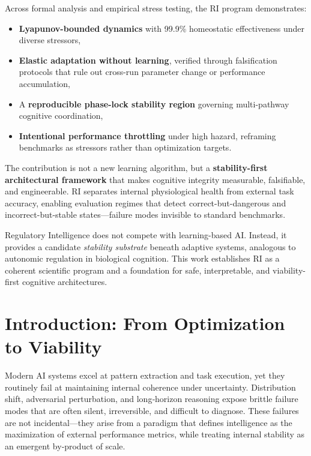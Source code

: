\documentclass[12pt,a4paper]{report}
\begin{document}
Across formal analysis and empirical stress testing, the RI program demonstrates:

\begin{itemize}
    \item \textbf{Lyapunov-bounded dynamics} with 99.9\% homeostatic effectiveness under diverse stressors,
    \item \textbf{Elastic adaptation without learning}, verified through falsification protocols that rule out cross-run parameter change or performance accumulation,
    \item A \textbf{reproducible phase-lock stability region} governing multi-pathway cognitive coordination,
    \item \textbf{Intentional performance throttling} under high hazard, reframing benchmarks as stressors rather than optimization targets.
\end{itemize}

The contribution is not a new learning algorithm, but a \textbf{stability-first architectural framework} that makes cognitive integrity measurable, falsifiable, and engineerable. RI separates internal physiological health from external task accuracy, enabling evaluation regimes that detect correct-but-dangerous and incorrect-but-stable states—failure modes invisible to standard benchmarks.

Regulatory Intelligence does not compete with learning-based AI. Instead, it provides a candidate \textit{stability substrate} beneath adaptive systems, analogous to autonomic regulation in biological cognition. This work establishes RI as a coherent scientific program and a foundation for safe, interpretable, and viability-first cognitive architectures.

\section{Introduction: From Optimization to Viability}

Modern AI systems excel at pattern extraction and task execution, yet they routinely fail at maintaining internal coherence under uncertainty. Distribution shift, adversarial perturbation, and long‑horizon reasoning expose brittle failure modes that are often silent, irreversible, and difficult to diagnose. These failures are not incidental—they arise from a paradigm that defines intelligence as the maximization of external performance metrics, while treating internal stability as an emergent by‑product of scale.
\end{document}
